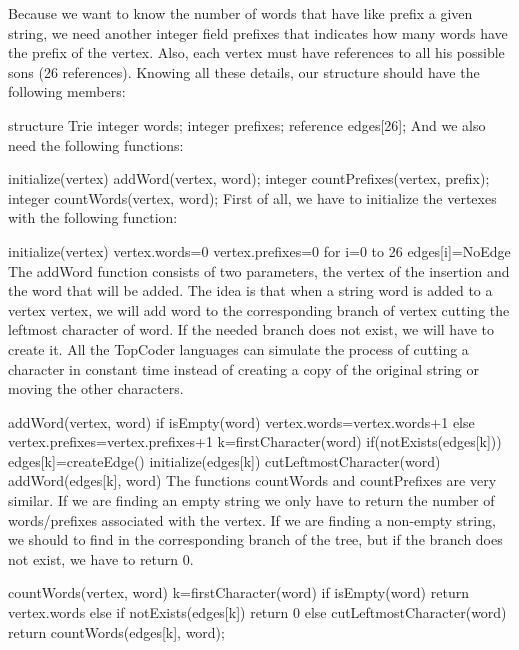 Because we want to know the number of words that have like prefix a given string, we need another integer field prefixes that indicates how many words have the prefix of the vertex. Also, each vertex must have references to all his possible sons (26 references). Knowing all these details, our structure should have the following members:

structure Trie
    integer words;
    integer prefixes;
    reference edges[26];
And we also need the following functions:

initialize(vertex)
addWord(vertex, word);
integer countPrefixes(vertex, prefix);
integer countWords(vertex, word);
First of all, we have to initialize the vertexes with the following function:

initialize(vertex)
    vertex.words=0
    vertex.prefixes=0
    for i=0 to 26
        edges[i]=NoEdge
The addWord function consists of two parameters, the vertex of the insertion and the word that will be added. The idea is that when a string word is added to a vertex vertex, we will add word to the corresponding branch of vertex cutting the leftmost character of word. If the needed branch does not exist, we will have to create it. All the TopCoder languages can simulate the process of cutting a character in constant time instead of creating a copy of the original string or moving the other characters.

addWord(vertex, word)
    if isEmpty(word)
        vertex.words=vertex.words+1
    else
        vertex.prefixes=vertex.prefixes+1
        k=firstCharacter(word)
        if(notExists(edges[k]))
            edges[k]=createEdge()
            initialize(edges[k])
        cutLeftmostCharacter(word)
        addWord(edges[k], word)
The functions countWords and countPrefixes are very similar. If we are finding an empty string we only have to return the number of words/prefixes associated with the vertex. If we are finding a non-empty string, we should to find in the corresponding branch of the tree, but if the branch does not exist, we have to return 0.

countWords(vertex, word)
    k=firstCharacter(word)
    if isEmpty(word)
        return vertex.words
    else if notExists(edges[k])
        return 0
    else
        cutLeftmostCharacter(word)
        return countWords(edges[k], word);

